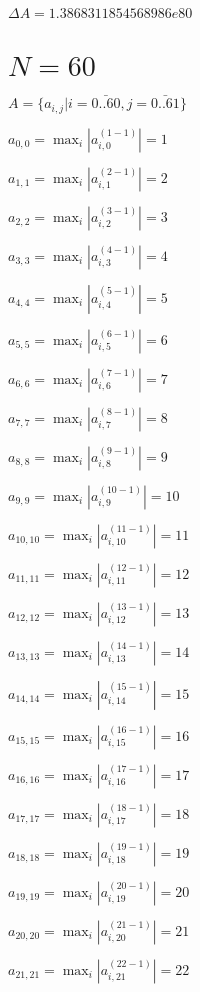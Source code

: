 \documentclass[a4paper,12pt]{article}
\begin{document}
$\Delta A = 1.3868311854568986e80$



\section{ $N = 60$ }
$A = \{ a _{ i, j } | i = \bar { 0..60 }, j = \bar { 0..61 } \}$

$a _{ 0, 0 } =  \max _i |a _{ i, 0 } ^{ (1 - 1) } | = 1$

$a _{ 1, 1 } =  \max _i |a _{ i, 1 } ^{ (2 - 1) } | = 2$

$a _{ 2, 2 } =  \max _i |a _{ i, 2 } ^{ (3 - 1) } | = 3$

$a _{ 3, 3 } =  \max _i |a _{ i, 3 } ^{ (4 - 1) } | = 4$

$a _{ 4, 4 } =  \max _i |a _{ i, 4 } ^{ (5 - 1) } | = 5$

$a _{ 5, 5 } =  \max _i |a _{ i, 5 } ^{ (6 - 1) } | = 6$

$a _{ 6, 6 } =  \max _i |a _{ i, 6 } ^{ (7 - 1) } | = 7$

$a _{ 7, 7 } =  \max _i |a _{ i, 7 } ^{ (8 - 1) } | = 8$

$a _{ 8, 8 } =  \max _i |a _{ i, 8 } ^{ (9 - 1) } | = 9$

$a _{ 9, 9 } =  \max _i |a _{ i, 9 } ^{ (10 - 1) } | = 10$

$a _{ 10, 10 } =  \max _i |a _{ i, 10 } ^{ (11 - 1) } | = 11$

$a _{ 11, 11 } =  \max _i |a _{ i, 11 } ^{ (12 - 1) } | = 12$

$a _{ 12, 12 } =  \max _i |a _{ i, 12 } ^{ (13 - 1) } | = 13$

$a _{ 13, 13 } =  \max _i |a _{ i, 13 } ^{ (14 - 1) } | = 14$

$a _{ 14, 14 } =  \max _i |a _{ i, 14 } ^{ (15 - 1) } | = 15$

$a _{ 15, 15 } =  \max _i |a _{ i, 15 } ^{ (16 - 1) } | = 16$

$a _{ 16, 16 } =  \max _i |a _{ i, 16 } ^{ (17 - 1) } | = 17$

$a _{ 17, 17 } =  \max _i |a _{ i, 17 } ^{ (18 - 1) } | = 18$

$a _{ 18, 18 } =  \max _i |a _{ i, 18 } ^{ (19 - 1) } | = 19$

$a _{ 19, 19 } =  \max _i |a _{ i, 19 } ^{ (20 - 1) } | = 20$

$a _{ 20, 20 } =  \max _i |a _{ i, 20 } ^{ (21 - 1) } | = 21$

$a _{ 21, 21 } =  \max _i |a _{ i, 21 } ^{ (22 - 1) } | = 22$
\end{document}
